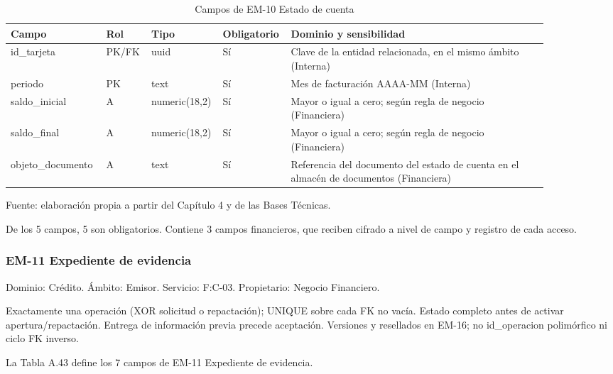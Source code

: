\documentclass[11pt]{article}
\begin{document}
\begin{table}[htbp]
\caption{Campos de EM-10 Estado de cuenta}\label{tab:d_em10}
\centering
\begin{tabular}{@{}p{0.167\linewidth}p{0.070\linewidth}p{0.079\linewidth}p{0.097\linewidth}p{0.465\linewidth}@{}}
\toprule Campo & Rol & Tipo & Obligatorio & Dominio y sensibilidad \\
\midrule
id\_tarjeta & PK/FK & uuid & Sí & Clave de la entidad relacionada, en el mismo ámbito (Interna) \\
periodo & PK & text & Sí & Mes de facturación AAAA-MM (Interna) \\
saldo\_inicial & A & numeric(18,2) & Sí & Mayor o igual a cero; según regla de negocio (Financiera) \\
saldo\_final & A & numeric(18,2) & Sí & Mayor o igual a cero; según regla de negocio (Financiera) \\
objeto\_documento & A & text & Sí & Referencia del documento del estado de cuenta en el almacén de documentos (Financiera) \\
\bottomrule
\end{tabular}
\par\smallskip
{\raggedright Fuente: elaboración propia a partir del Capítulo 4 y de las Bases Técnicas.\par}
\end{table}


De los 5 campos, 5 son obligatorios. Contiene 3 campos financieros, que reciben cifrado a nivel de campo y registro de cada acceso.

\subsubsection{EM-11 Expediente de evidencia}

Dominio: Crédito. Ámbito: Emisor. Servicio: F:C-03. Propietario: Negocio Financiero.

Exactamente una operación (XOR solicitud o repactación); UNIQUE sobre cada FK no vacía. Estado completo antes de activar apertura/repactación. Entrega de información previa precede aceptación. Versiones y resellados en EM-16; no id\_operacion polimórfico ni ciclo FK inverso.

La Tabla A.43 define los 7 campos de EM-11 Expediente de evidencia.
\end{document}

